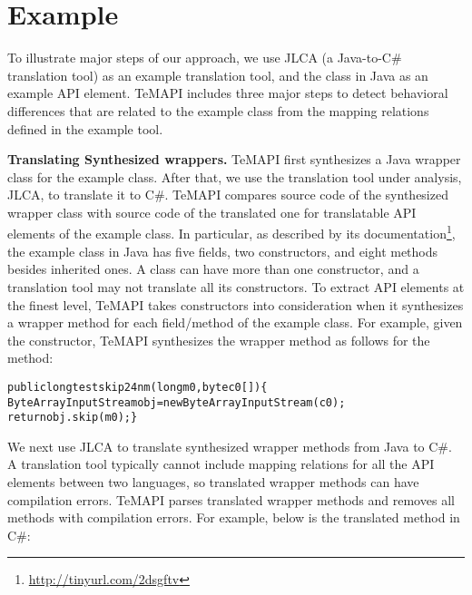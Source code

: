 \section{Example}
\label{sec:example}

To illustrate major steps of our approach, we use JLCA (a Java-to-C\# translation tool) as an example translation tool, and the  class in Java as an example API element. TeMAPI includes three major steps to detect behavioral differences that are related to the example class from the mapping relations defined in the example tool.

\textbf{Translating Synthesized wrappers.} TeMAPI first synthesizes a Java wrapper class for the example class. After that, we use the translation tool under analysis, JLCA, to translate it to C\#. TeMAPI compares source code of the synthesized wrapper class with source code of the translated one for translatable API elements of the example class. In particular, as described by its documentation\footnote{\url{http://tinyurl.com/2dsgftv}}, the example class in Java has five fields, two constructors, and eight methods besides inherited ones. A class can have more than one constructor, and a translation tool may not translate all its constructors. To extract API elements at the finest level, TeMAPI takes constructors into consideration when it synthesizes a wrapper method for each field/method of the example class. For example, given the  constructor, TeMAPI synthesizes the wrapper method as follows for the  method:

\begin{CodeOut}\vspace*{-1ex}
\begin{alltt}
public long testskip24nm(long m0, byte c0[])\{
  ByteArrayInputStream obj = new ByteArrayInputStream(c0);
  return obj.skip(m0);\}
\end{alltt}
\end{CodeOut}\vspace*{-2ex}

We next use JLCA to translate synthesized wrapper methods from Java to C\#. A translation tool typically cannot include mapping relations for all the API elements between two languages, so translated wrapper methods can have compilation errors. TeMAPI parses translated wrapper methods and removes all methods with compilation errors. For example, below is the translated  method in C\#:
\vspace*{-2ex}

